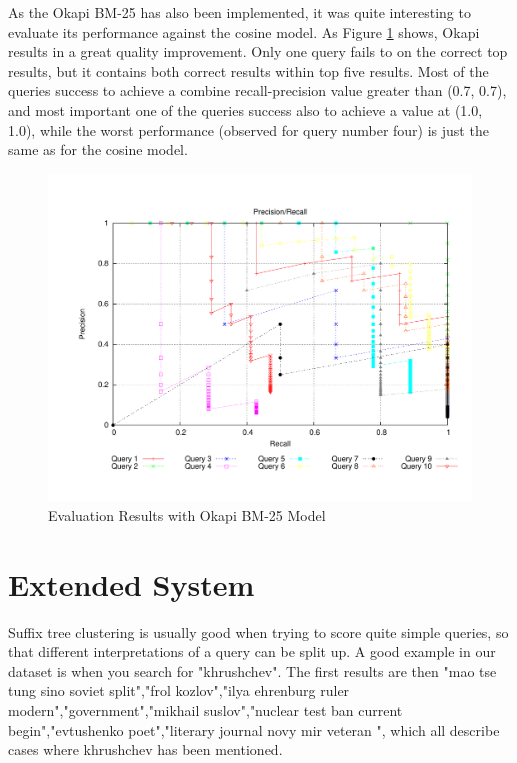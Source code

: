 As the Okapi BM-25 has also been implemented, it was quite interesting to evaluate its performance against the cosine model. As Figure \ref{fig:okapi} shows, Okapi results in a great quality improvement. Only one query fails to on the correct top results, but it contains both correct results within top five results. Most of the queries success to achieve a combine recall-precision value greater than (0.7, 0.7), and most important one of the queries success also to achieve a value at (1.0, 1.0), while the worst performance (observed for query number four) is just the same as for the cosine model.

\begin{figure}
\includegraphics[width=1.0\textwidth]{include/bench_okapi}
\caption{Evaluation Results with Okapi BM-25 Model}
\label{fig:okapi}
\end{figure}

\section{Extended System}

Suffix tree clustering is usually good when trying to score quite simple queries, so that different interpretations of a query can be split up. A good example in our dataset is when you search for "khrushchev". The first results are then "mao tse tung sino soviet split","frol kozlov","ilya ehrenburg ruler modern","government","mikhail suslov","nuclear test ban current begin","evtushenko poet","literary journal novy mir veteran ", which all describe cases where khrushchev has been mentioned.

